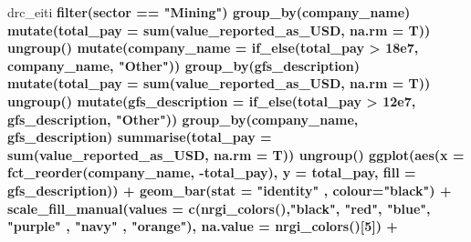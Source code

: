 \documentclass[]{article}
\newenvironment{Shaded}{\begin{snugshade}}{\end{snugshade}}
\newcommand{\DataTypeTok}[1]{\textcolor[rgb]{0.13,0.29,0.53}{#1}}
\newcommand{\DecValTok}[1]{\textcolor[rgb]{0.00,0.00,0.81}{#1}}
\newcommand{\FloatTok}[1]{\textcolor[rgb]{0.00,0.00,0.81}{#1}}
\newcommand{\KeywordTok}[1]{\textcolor[rgb]{0.13,0.29,0.53}{\textbf{#1}}}
\newcommand{\NormalTok}[1]{#1}
\newcommand{\OperatorTok}[1]{\textcolor[rgb]{0.81,0.36,0.00}{\textbf{#1}}}
\newcommand{\StringTok}[1]{\textcolor[rgb]{0.31,0.60,0.02}{#1}}
\begin{document}
\begin{Shaded}
\begin{Highlighting}[]
\NormalTok{drc_eiti }\OperatorTok{%>%}\StringTok{ }
\StringTok{  }\KeywordTok{filter}\NormalTok{(sector }\OperatorTok{==}\StringTok{ "Mining"}\NormalTok{) }\OperatorTok{%>%}\StringTok{ }
\StringTok{  }\KeywordTok{group_by}\NormalTok{(company_name) }\OperatorTok{%>%}\StringTok{ }
\StringTok{  }\KeywordTok{mutate}\NormalTok{(}\DataTypeTok{total_pay =} \KeywordTok{sum}\NormalTok{(value_reported_as_USD, }\DataTypeTok{na.rm =}\NormalTok{ T)) }\OperatorTok{%>%}\StringTok{ }
\StringTok{  }\KeywordTok{ungroup}\NormalTok{() }\OperatorTok{%>%}\StringTok{ }
\StringTok{  }\KeywordTok{mutate}\NormalTok{(}\DataTypeTok{company_name =} \KeywordTok{if_else}\NormalTok{(total_pay }\OperatorTok{>}\StringTok{ }\FloatTok{18e7}\NormalTok{, company_name, }\StringTok{"Other"}\NormalTok{)) }\OperatorTok{%>%}\StringTok{ }
\StringTok{  }\KeywordTok{group_by}\NormalTok{(gfs_description) }\OperatorTok{%>%}\StringTok{ }
\StringTok{  }\KeywordTok{mutate}\NormalTok{(}\DataTypeTok{total_pay =} \KeywordTok{sum}\NormalTok{(value_reported_as_USD, }\DataTypeTok{na.rm =}\NormalTok{ T)) }\OperatorTok{%>%}\StringTok{ }
\StringTok{  }\KeywordTok{ungroup}\NormalTok{() }\OperatorTok{%>%}\StringTok{ }
\StringTok{  }\KeywordTok{mutate}\NormalTok{(}\DataTypeTok{gfs_description =} \KeywordTok{if_else}\NormalTok{(total_pay }\OperatorTok{>}\StringTok{ }\FloatTok{12e7}\NormalTok{, gfs_description, }\StringTok{"Other"}\NormalTok{)) }\OperatorTok{%>%}\StringTok{ }
\StringTok{  }\KeywordTok{group_by}\NormalTok{(company_name, gfs_description) }\OperatorTok{%>%}\StringTok{ }
\StringTok{  }\KeywordTok{summarise}\NormalTok{(}\DataTypeTok{total_pay =} \KeywordTok{sum}\NormalTok{(value_reported_as_USD, }\DataTypeTok{na.rm =}\NormalTok{ T)) }\OperatorTok{%>%}\StringTok{ }
\StringTok{  }\KeywordTok{ungroup}\NormalTok{() }\OperatorTok{%>%}\StringTok{ }
\StringTok{  }\KeywordTok{ggplot}\NormalTok{(}\KeywordTok{aes}\NormalTok{(}\DataTypeTok{x =} \KeywordTok{fct_reorder}\NormalTok{(company_name, }\OperatorTok{-}\NormalTok{total_pay), }\DataTypeTok{y =}\NormalTok{ total_pay, }\DataTypeTok{fill =}\NormalTok{ gfs_description)) }\OperatorTok{+}
\StringTok{  }\KeywordTok{geom_bar}\NormalTok{(}\DataTypeTok{stat =} \StringTok{"identity"}\NormalTok{ , }\DataTypeTok{colour=}\StringTok{"black"}\NormalTok{) }\OperatorTok{+}
\StringTok{  }\KeywordTok{scale_fill_manual}\NormalTok{(}\DataTypeTok{values =} \KeywordTok{c}\NormalTok{(}\KeywordTok{nrgi_colors}\NormalTok{(),}\StringTok{"black"}\NormalTok{, }\StringTok{"red"}\NormalTok{, }\StringTok{"blue"}\NormalTok{, }\StringTok{"purple"}\NormalTok{ , }\StringTok{"navy"}\NormalTok{ , }\StringTok{"orange"}\NormalTok{), }\DataTypeTok{na.value =} \KeywordTok{nrgi_colors}\NormalTok{()[}\DecValTok{5}\NormalTok{]) }\OperatorTok{+}
}}}}}}}}}}}}}
\end{Highlighting}
\end{Shaded}
\end{document}
